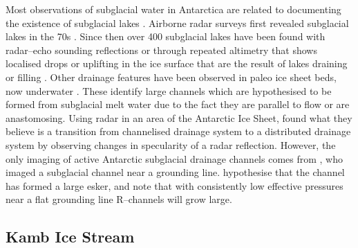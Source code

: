 Most observations of subglacial water in Antarctica are related to documenting the existence of subglacial lakes \citep[e.g.][]{carter2007radar,wright2012fourth,siegfried2018thirteen}.
Airborne radar surveys first revealed subglacial lakes in the 70s \citep{robin1970radio}. Since then over 400 subglacial lakes have been found \citep{siegert2016recent} with radar--echo sounding reflections \cite[e.g.][]{carter2007radar} or through repeated altimetry that shows localised drops or uplifting in the ice surface that are the result of lakes draining or filling \citep{wingham2006rapid, stearns2008increased, gray2005evidence, fricker2007active}. 
Other drainage features have been observed in paleo ice sheet beds, now underwater  \cite[e.g.][]{nitsche2013paleo, anderson2008geomorphology}. These identify large channels which are hypothesised to be formed from subglacial melt water due to the fact they are parallel to flow or are anastomosing.  Using radar in an area of the Antarctic Ice Sheet, \cite{schroeder2013evidence} found what they believe is a transition from channelised drainage system to a distributed drainage system by observing changes in specularity of a radar reflection. However, the only imaging of active Antarctic subglacial drainage channels comes from \cite{drews2017actively}, who imaged a subglacial channel near a grounding line. \cite{drews2017actively} hypothesise that the channel has formed a large esker, and note that with consistently low effective pressures near a flat grounding line R--channels will grow large.

\subsection{Kamb Ice Stream}

